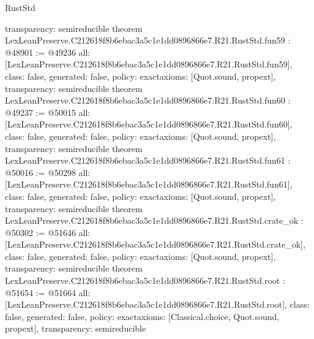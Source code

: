 \begin{lexlean}{RustStd}
\begin{coremodule}
{  transparency: semireducible
}
theorem LexLeanPreserve.C212618f8b6ebac3a5c1e1dd0896866e7.R21.RustStd.fun59 : @48901 := @49236 {
  all: [LexLeanPreserve.C212618f8b6ebac3a5c1e1dd0896866e7.R21.RustStd.fun59],
  class: false,
  generated: false,
  policy: exact{axioms: [Quot.sound, propext]},
  transparency: semireducible
}
theorem LexLeanPreserve.C212618f8b6ebac3a5c1e1dd0896866e7.R21.RustStd.fun60 : @49237 := @50015 {
  all: [LexLeanPreserve.C212618f8b6ebac3a5c1e1dd0896866e7.R21.RustStd.fun60],
  class: false,
  generated: false,
  policy: exact{axioms: [Quot.sound, propext]},
  transparency: semireducible
}
theorem LexLeanPreserve.C212618f8b6ebac3a5c1e1dd0896866e7.R21.RustStd.fun61 : @50016 := @50298 {
  all: [LexLeanPreserve.C212618f8b6ebac3a5c1e1dd0896866e7.R21.RustStd.fun61],
  class: false,
  generated: false,
  policy: exact{axioms: [Quot.sound, propext]},
  transparency: semireducible
}
theorem LexLeanPreserve.C212618f8b6ebac3a5c1e1dd0896866e7.R21.RustStd.crate_ok : @50302 := @51646 {
  all: [LexLeanPreserve.C212618f8b6ebac3a5c1e1dd0896866e7.R21.RustStd.crate_ok],
  class: false,
  generated: false,
  policy: exact{axioms: [Quot.sound, propext]},
  transparency: semireducible
}
theorem LexLeanPreserve.C212618f8b6ebac3a5c1e1dd0896866e7.R21.RustStd.root : @51654 := @51664 {
  all: [LexLeanPreserve.C212618f8b6ebac3a5c1e1dd0896866e7.R21.RustStd.root],
  class: false,
  generated: false,
  policy: exact{axioms: [Classical.choice, Quot.sound, propext]},
  transparency: semireducible
}


\end{coremodule}
\end{lexlean}
